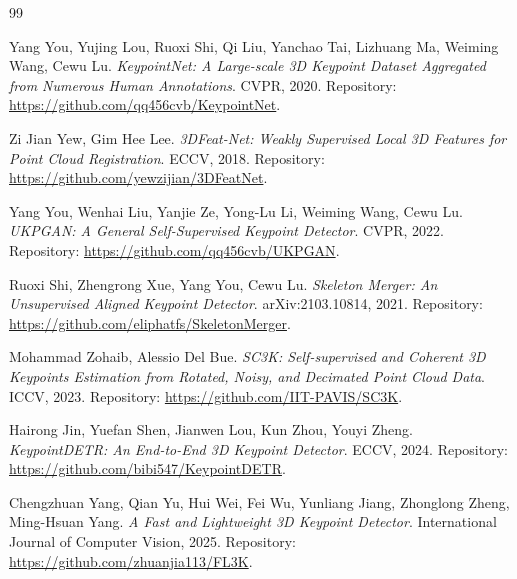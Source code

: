 \documentclass[11pt,a4paper]{article}
\begin{document}
\newpage
\begin{thebibliography}{99}

Yang You, Yujing Lou, Ruoxi Shi, Qi Liu, Yanchao Tai, Lizhuang Ma, Weiming Wang, Cewu Lu.
\newblock \emph{KeypointNet: A Large-scale 3D Keypoint Dataset Aggregated from Numerous Human Annotations}.
\newblock CVPR, 2020. Repository: \url{https://github.com/qq456cvb/KeypointNet}.

Zi Jian Yew, Gim Hee Lee.
\newblock \emph{3DFeat-Net: Weakly Supervised Local 3D Features for Point Cloud Registration}.
\newblock ECCV, 2018. Repository: \url{https://github.com/yewzijian/3DFeatNet}.

Yang You, Wenhai Liu, Yanjie Ze, Yong-Lu Li, Weiming Wang, Cewu Lu.
\newblock \emph{UKPGAN: A General Self-Supervised Keypoint Detector}.
\newblock CVPR, 2022. Repository: \url{https://github.com/qq456cvb/UKPGAN}.

Ruoxi Shi, Zhengrong Xue, Yang You, Cewu Lu.
\newblock \emph{Skeleton Merger: An Unsupervised Aligned Keypoint Detector}.
\newblock arXiv:2103.10814, 2021. Repository: \url{https://github.com/eliphatfs/SkeletonMerger}.

Mohammad Zohaib, Alessio Del Bue.
\newblock \emph{SC3K: Self-supervised and Coherent 3D Keypoints Estimation from Rotated, Noisy, and Decimated Point Cloud Data}.
\newblock ICCV, 2023. Repository: \url{https://github.com/IIT-PAVIS/SC3K}.

Hairong Jin, Yuefan Shen, Jianwen Lou, Kun Zhou, Youyi Zheng.
\newblock \emph{KeypointDETR: An End-to-End 3D Keypoint Detector}.
\newblock ECCV, 2024. Repository: \url{https://github.com/bibi547/KeypointDETR}.

Chengzhuan Yang, Qian Yu, Hui Wei, Fei Wu, Yunliang Jiang, Zhonglong Zheng, Ming-Hsuan Yang.
\newblock \emph{A Fast and Lightweight 3D Keypoint Detector}.
\newblock International Journal of Computer Vision, 2025. Repository: \url{https://github.com/zhuanjia113/FL3K}.

\end{thebibliography}
\end{document}
